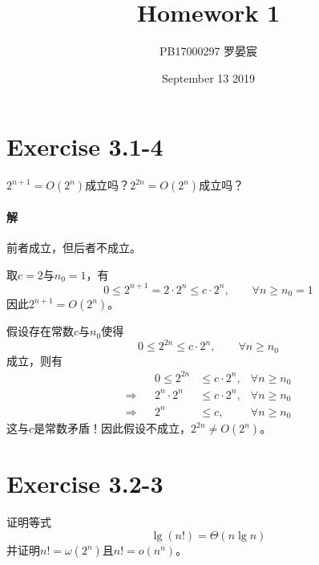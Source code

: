 \documentclass{article}
\title{Homework 1}
\author{PB17000297 罗晏宸}
\date{September 13 2019}
\begin{document}
\maketitle

\section{Exercise 3.1-4}
$2^{n+1}=O(2^n)$成立吗？$2^{2n}=O(2^n)$成立吗？
\\

\paragraph{解} 
前者成立，但后者不成立。\par
取$c=2$与$n_0=1$，有
\begin{equation*}
    0 \leq 2^{n+1} = 2 \cdot 2^n \leq c \cdot 2^n, \qquad \forall n \geq n_0 = 1
\end{equation*}
因此$2^{n+1}=O(2^n)$。\par
假设存在常数$c$与$n_0$使得
\begin{equation*}
    0 \leq 2^{2n} \leq c \cdot 2^n, \qquad \forall n \geq n_0
\end{equation*}
成立，则有
\begin{align*}
    && 0 \leq 2^{2n} &\leq c \cdot 2^n, & \forall n \geq n_0 \\
    \Rightarrow && 2^n \cdot 2^n &\leq c \cdot 2^n, &  \forall n \geq n_0 \\
    \Rightarrow && 2^n &\leq c, & \forall n \geq n_0
\end{align*}
这与$c$是常数矛盾！因此假设不成立，$2^{2n} \neq O(2^n)$。
\\

\section{Exercise 3.2-3}
证明等式
\begin{equation}
    \lg{(n!)}=\Theta(n \lg{n}) \tag{3.19}
\end{equation}
并证明$n!=\omega (2^n)$且$n!=o(n^n)$。
\\
\end{document}
